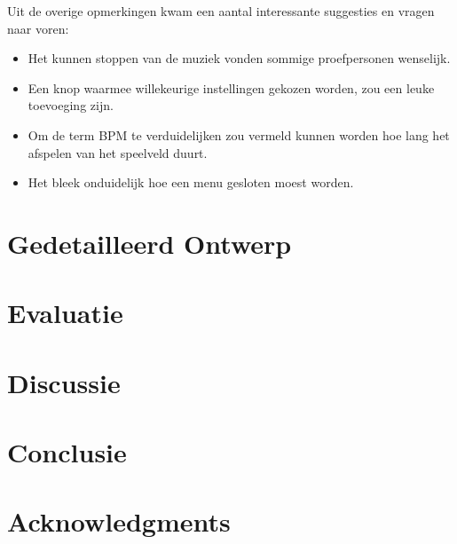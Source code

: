 \documentclass{acm}
\begin{document}
Uit de overige opmerkingen kwam een aantal interessante suggesties en vragen naar voren:
\begin{itemize}
  \item Het kunnen stoppen van de muziek vonden sommige proefpersonen wenselijk.
  \item Een knop waarmee willekeurige instellingen gekozen worden, zou een leuke toevoeging zijn.
  \item Om de term BPM te verduidelijken zou vermeld kunnen worden hoe lang het afspelen van het speelveld duurt.
  \item Het bleek onduidelijk hoe een menu gesloten moest worden.
\end{itemize}



\section{Gedetailleerd Ontwerp}
\label{sec_detail}


\section{Evaluatie}
\label{sec_evaluatie}

\section{Discussie}
\label{sec_discussie}

\section{Conclusie}
\label{sec_conclusie}

\section{Acknowledgments}
\end{document}
